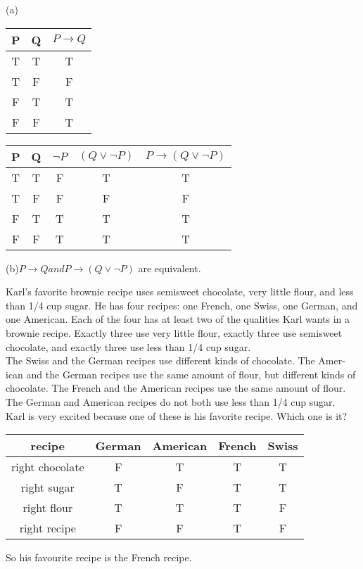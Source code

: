 \documentclass[11pt, a4paper, UTF8]{ctexart}
\begin{document}
\begin{solution}
(a)
\begin{tabular}{|c|c|c|}
\hline
P & Q & $P \rightarrow Q$\\
\hline
T & T & T\\
\hline
T & F & F\\
\hline
F & T & T\\
\hline
F & F & T\\
\hline
\end{tabular}

\begin{tabular}{|c|c|c|c|c|}
\hline
P & Q & $\neg P$ & $(Q \vee \neg P)$ & $P \rightarrow (Q \vee \neg P)$ \\
\hline
T & T & F        &   T               &    T\\
\hline
T & F & F        &   F               &    F\\
\hline
F & T & T        &   T               &    T\\
\hline
F & F & T        &   T               &    T\\
\hline
\end{tabular}
(b)$P \rightarrow Q and P \rightarrow (Q \vee \neg P)$ are equivalent.
\end{solution}


\begin{problem}[UD:3.9]
Karl’s favorite brownie recipe uses semisweet chocolate, very little flour, and less than 1/4 cup sugar. He has four recipes: one French, one Swiss, one German, and one American. Each of the four has at least two of the qualities Karl wants in a brownie recipe. Exactly three use very little flour, exactly three use semisweet chocolate, and exactly three use less than 1/4 cup sugar.\\
The Swiss and the German recipes use different kinds of chocolate. The Amer- ican and the German recipes use the same amount of flour, but different kinds of chocolate. The French and the American recipes use the same amount of flour. The German and American recipes do not both use less than 1/4 cup sugar.\\
Karl is very excited because one of these is his favorite recipe. Which one is it?
\end{problem}

\begin{solution}
\begin{tabular}{|c|c|c|c|c|}
\hline
recipe          & German & American & French & Swiss\\
\hline
right chocolate &   F    &    T     &    T   &   T\\
\hline
right sugar     &   T    &    F     &    T   &   T\\
\hline
right flour     &   T    &    T     &    T   &   F\\
\hline
right recipe    &   F    &    F     &    T   &   F\\
\hline
\end{tabular}
So his favourite recipe is the French recipe.
\end{solution}
\end{document}
